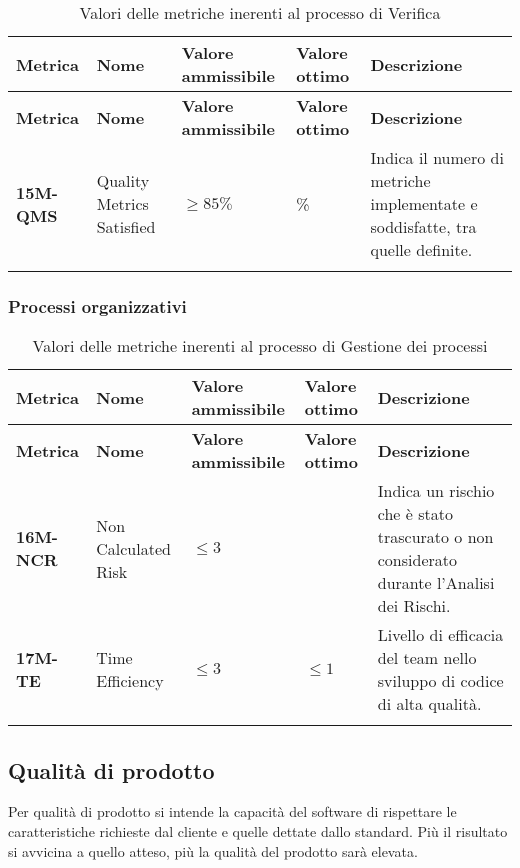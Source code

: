 \begin{longtable}{|>{\centering\arraybackslash}p{}|>{\centering\arraybackslash}p{}|>{\centering\arraybackslash}p{}|>{\centering\arraybackslash}p{}|>{\centering\arraybackslash}p{}|}
    \hline
    \textbf{Metrica} & \textbf{Nome} & \textbf{Valore ammissibile} & \textbf{Valore ottimo}& \textbf{Descrizione}\\
	\hline
    \endfirsthead
    \hline
    \textbf{Metrica} & \textbf{Nome} & \textbf{Valore ammissibile} & \textbf{Valore ottimo}& \textbf{Descrizione}\\
    \endhead
	\textbf{15M-QMS} & Quality Metrics Satisfied & $\geq 85\% $ & 100\% & Indica il numero di metriche implementate e soddisfatte, tra quelle definite.\\
	\hline
	\caption{ Valori delle metriche inerenti al processo di Verifica}
	\label{table:5}
\end{longtable}
\subsubsection{Processi organizzativi}
\begin{longtable}{|>{\centering\arraybackslash}p{}|>{\centering\arraybackslash}p{}|>{\centering\arraybackslash}p{}|>{\centering\arraybackslash}p{}|>{\centering\arraybackslash}p{}|}
    \hline
    \textbf{Metrica} & \textbf{Nome} & \textbf{Valore ammissibile} & \textbf{Valore ottimo}& \textbf{Descrizione}\\
	\hline
    \endfirsthead
    \hline
    \textbf{Metrica} & \textbf{Nome} & \textbf{Valore ammissibile} & \textbf{Valore ottimo}& \textbf{Descrizione}\\
    \endhead
	\hline
	\textbf{16M-NCR} & Non Calculated Risk & $\leq 3 $ & 0 & Indica un rischio che è stato trascurato o non considerato durante l’Analisi dei Rischi.\\
	\hline
	\textbf{17M-TE} & Time Efficiency & $\leq 3 $ & $\leq 1 $ & Livello di efficacia del team nello sviluppo di codice di alta qualità.\\
	\hline
	\caption{ Valori delle metriche inerenti al processo di Gestione dei processi}
	\label{table:6}
\end{longtable}
\subsection{Qualità di prodotto}
Per qualità di prodotto si intende la capacità del software di rispettare 
le caratteristiche richieste dal cliente e quelle dettate dallo standard.
Più il risultato si avvicina a quello atteso, più la qualità del prodotto
sarà elevata. 
\newpage

